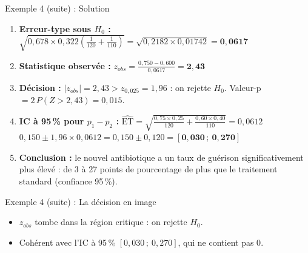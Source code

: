 \documentclass{BeamerTemplate}
\begin{document}
\begin{frame}[t]{Exemple 4 (suite) : Solution}
  \begin{enumerate}\itemsep 1.5mm
    \item \textbf{Erreur-type sous $H_0$ :}
      $\sqrt{0{,}678 \times 0{,}322 \left(\frac{1}{120} + \frac{1}{110}\right)} = \sqrt{0{,}2182 \times 0{,}01742} = \mathbf{0{,}0617}$
    \item \textbf{Statistique observée :}
      $\displaystyle z_{obs} = \frac{0{,}750 - 0{,}600}{0{,}0617} = \mathbf{2{,}43}$
    \item \textbf{Décision :} $|z_{obs}| = 2{,}43 > z_{0{,}025} = 1{,}96$ : on \alert{rejette $H_0$}. Valeur-p $= 2\,P(Z > 2{,}43) = 0{,}015$.
    \item<2-> \textbf{IC à 95\,\% pour $p_1 - p_2$ :}
      $\widehat{\text{ET}} = \sqrt{\frac{0{,}75 \times 0{,}25}{120} + \frac{0{,}60 \times 0{,}40}{110}} = 0{,}0612$
      \\ $0{,}150 \pm 1{,}96 \times 0{,}0612 = 0{,}150 \pm 0{,}120 = [\mathbf{0{,}030}\,;\ \mathbf{0{,}270}]$
    \item<2-> \textbf{Conclusion :} le nouvel antibiotique a un taux de guérison significativement plus élevé : de 3 à 27 points de pourcentage de plus que le traitement standard (confiance 95\,\%).
  \end{enumerate}
\end{frame}

\begin{frame}[t]{Exemple 4 (suite) : La décision en image}
  \centering

  \medskip
  \begin{itemize}\itemsep 2mm
    \item $z_{obs}$ tombe dans la \alert{région critique} : on rejette $H_0$.
    \item Cohérent avec l'IC à 95\,\% $[0{,}030\,;\ 0{,}270]$, qui \alert{ne contient pas 0}.
  \end{itemize}
\end{frame}
\end{document}
